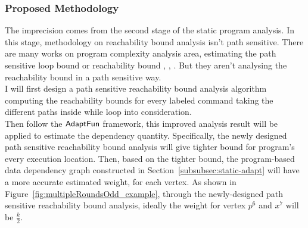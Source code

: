 \subsubsection{Proposed Methodology}
\label{subsubsec:furthers-reachability}
The imprecision comes from the second stage of the static program analysis.
In this stage, 
methodology on reachability bound analysis isn't path sensitive. 
There are many works on program complexity analysis area, estimating the path sensitive loop bound 
or reachability bound
\cite{GustafssonEL05, HumenbergerJK18}, 
\cite{BrockschmidtEFFG16,AlbertAGP08,AliasDFG10,Flores-MontoyaH14}, 
\cite{GulwaniZ10, SinnZV17,GulwaniJK09, GulwaniMC09, abs-2203-04243}. 
But they aren't analysing the reachability
bound in a path sensitive way.
\\
I will first design a path sensitive reachability bound analysis algorithm computing the 
reachability bounds for every labeled command taking the different paths inside while loop into consideration.
\\
Then follow the $\textsf{AdaptFun}$ framework,
this improved analysis result will be applied to estimate the dependency quantity.
Specifically, the newly designed path sensitive reachability bound analysis will 
give tighter bound for program's every execution location.
Then, based on the tighter bound,
the program-based data dependency graph constructed in Section~\ref{subsubsec:static-adapt}
will have a more accurate estimated weight, for each vertex.
%
As shown in Figure~\ref{fig:multipleRoundsOdd_example}, 
through the newly-designed path sensitive reachability bound analysis,
ideally the weight for vertex $p^6$ and $x^7$ will be $\frac{k}{2}$.

